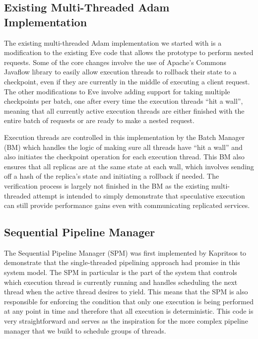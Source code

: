 \documentclass[11pt, oneside]{report}
\begin{document}
\subsection{Existing Multi-Threaded Adam Implementation}\label{BM}

The existing multi-threaded Adam implementation we started with is a modification to the existing Eve \cite{eve} code that allows the prototype to perform nested requests. 
Some of the core changes involve the use of Apache's Commons Javaflow library \cite{javaflow} to easily allow execution threads to rollback their state to a checkpoint, even if they are currently in the middle of executing a client request. 
The other modifications to Eve involve adding support for taking multiple checkpoints per batch, one after every time the execution threads ``hit a wall'', meaning that all currently active execution threads are either finished with the entire batch of requests or are ready to make a nested request.

Execution threads are controlled in this implementation by the Batch Manager (BM) which handles the logic of making sure all threads have ``hit a wall'' and also initiates the checkpoint operation for each execution thread. 
This BM also ensures that all replicas are at the same state at each wall, which involves sending off a hash of the replica's state and initiating a rollback if needed. 
The verification process is largely not finished in the BM as the existing multi-threaded attempt is intended to simply demonstrate that speculative execution can still provide performance gains even with communicating replicated services.

\subsection{Sequential Pipeline Manager}\label{SPM}

The Sequential Pipeline Manager (SPM) was first implemented by Kapritsos to demonstrate that the single-threaded pipelining approach had promise in this system model. 
The SPM in particular is the part of the system that controls which execution thread is currently running and handles scheduling the next thread when the active thread desires to yield.
This means that the SPM is also responsible for enforcing the condition that only one execution is being performed at any point in time and therefore that all execution is deterministic.
This code is very straightforward and serves as the inspiration for the more complex pipeline manager that we build to schedule groups of threads.
\end{document}
